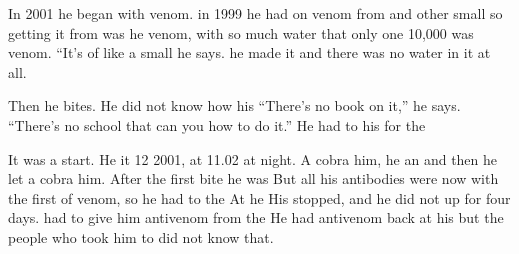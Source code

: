 \begin{lessonbody}
In 2001 he began   with venom.  in 1999 he had  on  venom from  and other small  so getting it from  was    he   venom,  with so much water that only one   10,000 was venom. 
“It’s  of like a small   he says.  he made it  and   there was no water in it at all.

Then he     bites. He did not know how  his     “There’s no book on it,” he says. “There’s no school that can  you how to do it.” He had to   his   for the 

It was a  start. He  it   12  2001, at 11.02 at night. A cobra  him, he  an  and then he let a  cobra  him. After the first bite he was  But all his antibodies were now  with the first  of venom, so he had   to  the  At  he  His  stopped, and he did not  up for four days.  had to give him antivenom from the   He  had antivenom back at his  but the people who took him to  did not know that.


\end{lessonbody}
